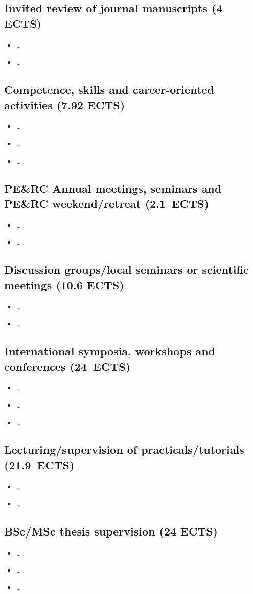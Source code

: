 \subsection*{Invited review of journal manuscripts (4 ECTS)}
\begin{itemize}[nolistsep]
    \item \dots
    \item \dots
\end{itemize}

\subsection*{Competence, skills and career-oriented activities (7.92 ECTS)}
\begin{itemize}[nolistsep]
    \item \dots
    \item \dots
    \item \dots
\end{itemize}

\subsection*{PE\&RC Annual meetings, seminars and PE\&RC weekend/retreat (2.1~ECTS)}
\begin{itemize}[nolistsep]
    \item \dots
    \item \dots
\end{itemize}

\subsection*{Discussion groups/local seminars or scientific meetings (10.6 ECTS)}
\begin{itemize}[nolistsep]
    \item \dots
    \item \dots
\end{itemize}

\subsection*{International symposia, workshops and conferences (24~ECTS)}
\begin{itemize}[nolistsep]
    \item \dots
    \item \dots
    \item \dots
\end{itemize}

\subsection*{Lecturing/supervision of practicals/tutorials (21.9~ECTS)}
\begin{itemize}[nolistsep]
    \item \dots
    \item \dots
\end{itemize}

\subsection*{BSc/MSc thesis supervision (24 ECTS)}
\begin{itemize}[nolistsep]
    \item \dots
    \item \dots
    \item \dots
\end{itemize}
